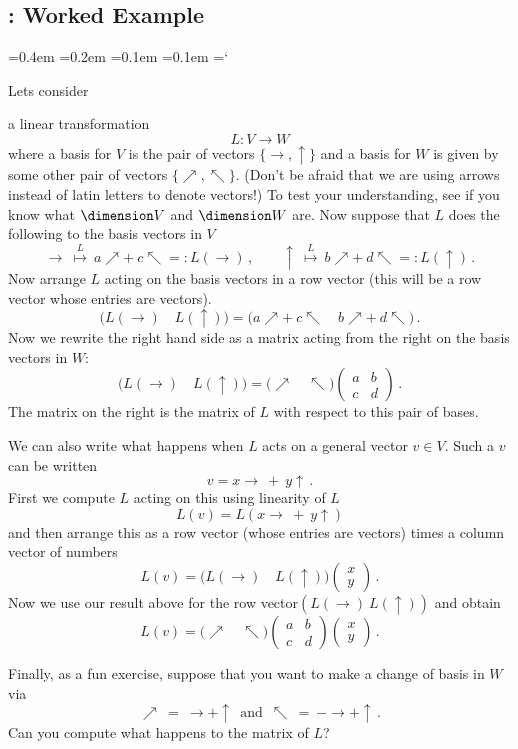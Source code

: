 
\subsection{\eigenTitle: Worked Example}

{\ttfamily
{}\font=0.4em
\font=0.2em
\font=0.1em
\font=0.1em
\hyphenchar\font=`\-


\hypertarget{scripts_eigenvalseigenvects_matrix}{Lets consider }
a linear transformation 
\[L:V\longrightarrow W\]
where a basis for $V$ is the pair of vectors $\{\to,\uparrow\}$
and a basis for $W$ is given by some other pair of vectors $\{\nearrow,\nwarrow\}$. (Don't be afraid that we are using arrows instead of latin letters to denote vectors!) To test your understanding, see if you know what $\dimension V$ and $\dimension W$ are. Now suppose that $L$ does the 
following to the basis vectors in $V$
\[
\to \ \stackrel{L}\mapsto\  a\nearrow + \ c\nwarrow =: L(\to)\, ,\qquad \uparrow \ \stackrel{L}\mapsto \ 
b\nearrow +\  d\nwarrow=: L(\uparrow)\, .
\]
Now arrange $L$ acting on the basis vectors in a row vector (this will be a row vector whose entries are vectors).
\[
\big(L(\to)\quad L(\uparrow)\big)
=
\big(a\nearrow + \ c\nwarrow\quad b\nearrow + \ d\nwarrow\big)\, .
\]
Now we rewrite the right hand side as a matrix acting from the right on the basis vectors in $W$:
\[
\big(L(\to)\quad L(\uparrow)\big)
=
\big(\nearrow\quad \nwarrow\big)
\begin{pmatrix}
a&b\\c&d
\end{pmatrix}\, .
\]
The matrix on the right is the matrix of $L$ with respect to this pair of bases.

We can also write what happens when $L$ acts on a general vector $v\in V$. Such a $v$ can be written
\[
v=x \to \ + \ y \uparrow\, .
\]
First we compute $L$ acting on this using linearity of $L$
\[
L(v) = L(x \to \ + \ y \uparrow)
\]
and then arrange this as a row vector (whose entries are vectors) times a column vector of numbers
\[
L(v) = \big(L(\to)\quad  L(\uparrow)\big)\begin{pmatrix}x\\y\end{pmatrix}\, .
\] 
Now we use our result above for the row vector$(L(\to)\ L(\uparrow))$
and obtain
\[
L(v) = \big(\nearrow\quad \nwarrow\big)
\begin{pmatrix}
a&b\\c&d
\end{pmatrix}
\begin{pmatrix}x\\y\end{pmatrix}\, .
\]

Finally, as a fun exercise, suppose that you want to make a change of basis in $W$ via
\[
\nearrow \ = \ \to + \uparrow\, \mbox{ and } \, \nwarrow\ =\  -\to + \uparrow\, .
\]
Can you compute what happens to the matrix of $L$?

} %

\newpage
